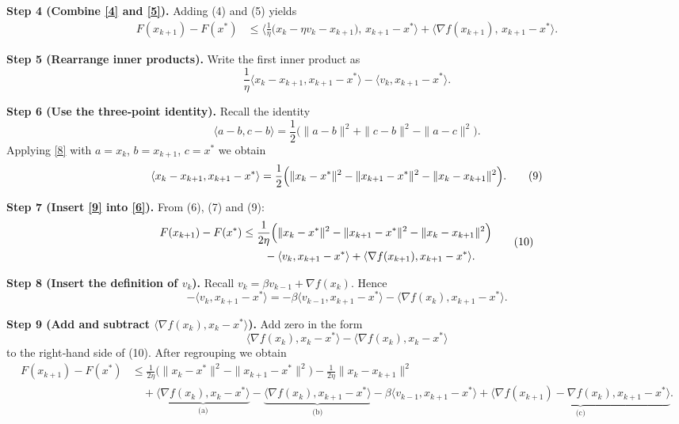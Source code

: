 \documentclass{article}
\begin{document}
\noindent\textbf{Step 4 (Combine \eqref{4} and \eqref{5}).}  
Adding (4) and (5) yields
\[
\begin{aligned}
F(x_{k+1})-F(x^{*})
&\le
\Big\langle \frac{1}{\eta}\bigl(x_{k}-\eta v_{k}-x_{k+1}\bigr),\,x_{k+1}-x^{*}\Big\rangle
+\langle\nabla f(x_{k+1}),\,x_{k+1}-x^{*}\rangle .
\end{aligned}
\tag{6}
\]

\noindent\textbf{Step 5 (Rearrange inner products).}  
Write the first inner product as
\[
\frac{1}{\eta}\langle x_{k}-x_{k+1},x_{k+1}-x^{*}\rangle
-\langle v_{k},x_{k+1}-x^{*}\rangle .
\tag{7}
\]

\noindent\textbf{Step 6 (Use the three‑point identity).}  
Recall the identity
\[
\langle a-b,c-b\rangle = \frac{1}{2}\bigl(\|a-b\|^{2}+\|c-b\|^{2}-\|a-c\|^{2}\bigr).
\tag{8}
\]
Applying \eqref{8} with $a=x_{k}$, $b=x_{k+1}$, $c=x^{*}$ we obtain
\[
\langle x_{k}-x_{k+1},x_{k+1}-x^{*}\rangle
= \frac{1}{2}\Bigl(\|x_{k}-x^{*}\|^{2}-\|x_{k+1}-x^{*}\|^{2}-\|x_{k}-x_{k+1}\|^{2}\Bigr).
\tag{9}
\]

\noindent\textbf{Step 7 (Insert \eqref{9} into \eqref{6}).}  
From (6), (7) and (9):
\[
\begin{aligned}
F(x_{k+1})-F(x^{*})
&\le
\frac{1}{2\eta}\Bigl(\|x_{k}-x^{*}\|^{2}-\|x_{k+1}-x^{*}\|^{2}-\|x_{k}-x_{k+1}\|^{2}\Bigr)\\
&\qquad -\langle v_{k},x_{k+1}-x^{*}\rangle
+\langle\nabla f(x_{k+1}),x_{k+1}-x^{*}\rangle .
\end{aligned}
\tag{10}
\]

\noindent\textbf{Step 8 (Insert the definition of $v_{k}$).}  
Recall $v_{k}= \beta v_{k-1}+ \nabla f(x_{k})$. Hence
\[
-\langle v_{k},x_{k+1}-x^{*}\rangle
= -\beta\langle v_{k-1},x_{k+1}-x^{*}\rangle
-\langle\nabla f(x_{k}),x_{k+1}-x^{*}\rangle .
\tag{11}
\]

\noindent\textbf{Step 9 (Add and subtract $\langle\nabla f(x_{k}),x_{k}-x^{*}\rangle$).}  
Add zero in the form
\[
\langle\nabla f(x_{k}),x_{k}-x^{*}\rangle
-\langle\nabla f(x_{k}),x_{k}-x^{*}\rangle
\]
to the right‑hand side of (10). After regrouping we obtain
\[
\begin{aligned}
F(x_{k+1})-F(x^{*})
&\le
\frac{1}{2\eta}\bigl(\|x_{k}-x^{*}\|^{2}-\|x_{k+1}-x^{*}\|^{2}\bigr)
-\frac{1}{2\eta}\|x_{k}-x_{k+1}\|^{2}\\
&\quad
+\underbrace{\langle\nabla f(x_{k}),x_{k}-x^{*}\rangle}_{\text{(a)}}
-\underbrace{\langle\nabla f(x_{k}),x_{k+1}-x^{*}\rangle}_{\text{(b)}}
-\beta\langle v_{k-1},x_{k+1}-x^{*}\rangle
+\underbrace{\langle\nabla f(x_{k+1})-\nabla f(x_{k}),x_{k+1}-x^{*}\rangle}_{\text{(c)}} .
\end{aligned}
\tag{12}
\]
\end{document}
